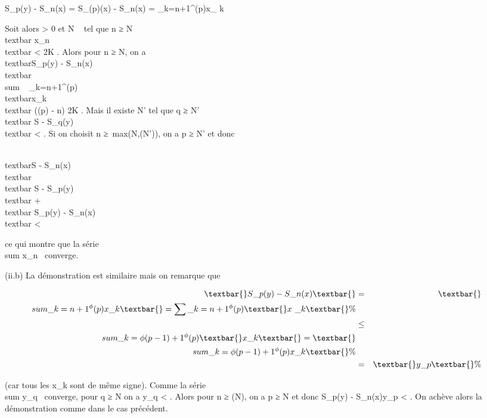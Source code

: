 \documentclass[]{article}
\begin{document}
S\_p(y) - S\_n(x) = S\_\phi(p)(x) - S\_n(x)
= \sum \_k=n+1^\phi(p)x\_ k~

Soit alors \epsilon \textgreater{} 0 et N \in {}~ tel que n ≥ N
\rigtharrow~\\textbar{} x\_n\\textbar{}
\textless{} \epsilon \over 2K . Alors pour n ≥ N, on a
\\textbar{}S\_p(y) -
S\_n(x)\\textbar{}
\leq\\sum ~
\_k=n+1^\phi(p)\\textbar{}x\_k\\textbar{}
\leq (\phi(p) - n) \epsilon \over 2K \leq \epsilon {} . Mais il existe N' tel que q ≥ N' \rigtharrow~\\textbar{} S -
S\_q(y)\\textbar{} \textless{} \epsilon
{} . Si on choisit n ≥\
max(N,\phi(N')), on a p ≥ N' et donc

\\textbar{}S - S\_n(x)\\textbar{}
\leq\\textbar{} S -
S\_p(y)\\textbar{} +\\textbar{}
S\_p(y) - S\_n(x)\\textbar{} \textless{}
\epsilon

ce qui montre que la série
\\sum  x\_n~
converge.

(ii.b) La démonstration est similaire mais on remarque que

\begin{align*} \textbar{}S\_p(y) -
S\_n(x)\textbar{}& =& \textbar{}\\sum
\_k=n+1^\phi(p)x\_ k\textbar{} =
\sum \_k=n+1^\phi(p)\textbar{}x~\_
k\textbar{} \%& \\ & \leq&
\\sum
\_k=\phi(p-1)+1^\phi(p)\textbar{}x\_ k\textbar{} =
\textbar{}\\sum
\_k=\phi(p-1)+1^\phi(p)x\_ k\textbar{}\%&
\\ & =& \textbar{}y\_p\textbar{}
\%& \\ \end{align*}

(car tous les x\_k sont de même signe). Comme la série
\\sum  y\_q~
converge, pour q ≥ N on a \textbar{}y\_q\textbar{} \textless{}
\epsilon {} . Alors pour n ≥ \phi(N), on a p ≥ N et donc
\textbar{}S\_p(y) -
S\_n(x)\textbar{}\leq\textbar{}y\_p\textbar{} \textless{}
\epsilon {} . On achève alors la démonstration comme dans
le cas précédent.
\end{document}
